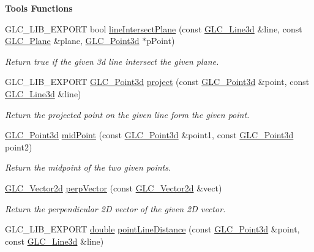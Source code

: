 \begin{Indent}{\bf Tools Functions}
\begin{DoxyCompactItemize}
G\-L\-C\-\_\-\-L\-I\-B\-\_\-\-E\-X\-P\-O\-R\-T bool \hyperlink{namespaceglc_a8bdef0e1ec05d75dbc0c8c370fae1ab8}{line\-Intersect\-Plane} (const \hyperlink{class_g_l_c___line3d}{G\-L\-C\-\_\-\-Line3d} \&line, const \hyperlink{class_g_l_c___plane}{G\-L\-C\-\_\-\-Plane} \&plane, \hyperlink{glc__vector3d_8h_a4e13a9bbc7ab3d34de7e98b41836772c}{G\-L\-C\-\_\-\-Point3d} $\ast$p\-Point)
\begin{DoxyCompactList}\small\item\em Return true if the given 3d line intersect the given plane. \end{DoxyCompactList}\item 
G\-L\-C\-\_\-\-L\-I\-B\-\_\-\-E\-X\-P\-O\-R\-T \hyperlink{glc__vector3d_8h_a4e13a9bbc7ab3d34de7e98b41836772c}{G\-L\-C\-\_\-\-Point3d} \hyperlink{namespaceglc_a336b18eedbe3fc2f78d6d1ea2a72b6c3}{project} (const \hyperlink{glc__vector3d_8h_a4e13a9bbc7ab3d34de7e98b41836772c}{G\-L\-C\-\_\-\-Point3d} \&point, const \hyperlink{class_g_l_c___line3d}{G\-L\-C\-\_\-\-Line3d} \&line)
\begin{DoxyCompactList}\small\item\em Return the projected point on the given line form the given point. \end{DoxyCompactList}\item 
\hyperlink{glc__vector3d_8h_a4e13a9bbc7ab3d34de7e98b41836772c}{G\-L\-C\-\_\-\-Point3d} \hyperlink{namespaceglc_ab918c024e6e7eb5667ef24a8132a7342}{mid\-Point} (const \hyperlink{glc__vector3d_8h_a4e13a9bbc7ab3d34de7e98b41836772c}{G\-L\-C\-\_\-\-Point3d} \&point1, const \hyperlink{glc__vector3d_8h_a4e13a9bbc7ab3d34de7e98b41836772c}{G\-L\-C\-\_\-\-Point3d} point2)
\begin{DoxyCompactList}\small\item\em Return the midpoint of the two given points. \end{DoxyCompactList}\item 
\hyperlink{class_g_l_c___vector2d}{G\-L\-C\-\_\-\-Vector2d} \hyperlink{namespaceglc_ae53951b6cdc7e05f244d4c7586fe3fb4}{perp\-Vector} (const \hyperlink{class_g_l_c___vector2d}{G\-L\-C\-\_\-\-Vector2d} \&vect)
\begin{DoxyCompactList}\small\item\em Return the perpendicular 2\-D vector of the given 2\-D vector. \end{DoxyCompactList}\item 
G\-L\-C\-\_\-\-L\-I\-B\-\_\-\-E\-X\-P\-O\-R\-T \hyperlink{_super_l_u_support_8h_a8956b2b9f49bf918deed98379d159ca7}{double} \hyperlink{namespaceglc_ac527bff20949d4743f56909a5dba8e47}{point\-Line\-Distance} (const \hyperlink{glc__vector3d_8h_a4e13a9bbc7ab3d34de7e98b41836772c}{G\-L\-C\-\_\-\-Point3d} \&point, const \hyperlink{class_g_l_c___line3d}{G\-L\-C\-\_\-\-Line3d} \&line)

\end{DoxyCompactItemize}
\end{Indent}
